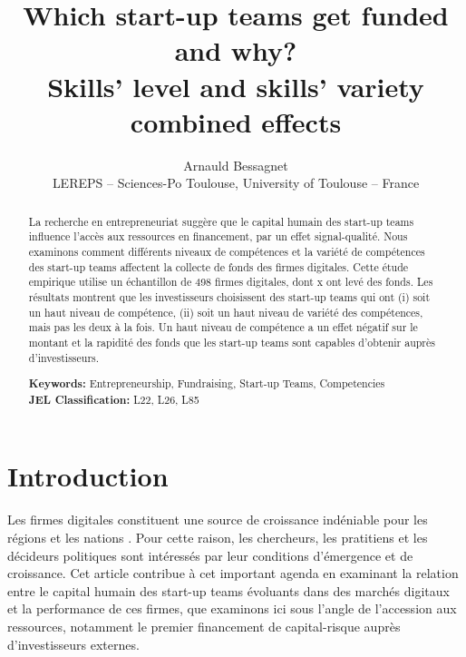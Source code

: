 \documentclass[12pt]{article}
\begin{document}
\title{Which start-up teams get funded and why? \\ Skills' level and skills' variety combined effects}
\date{\vspace{-3ex}}
\author{Arnauld Bessagnet \\ \footnotesize{LEREPS – Sciences-Po Toulouse, University of Toulouse – France} \\}

\maketitle \vspace{-1,5em}

\begin{abstract}
\noindent
La recherche en entrepreneuriat suggère que le capital humain des start-up teams influence l'accès aux ressources en financement, par un effet signal-qualité. Nous examinons comment différents niveaux de compétences et la variété de compétences des start-up teams affectent la collecte de fonds des firmes digitales. Cette étude empirique utilise un échantillon de 498 firmes digitales, dont x ont levé des fonds. Les résultats montrent que les investisseurs choisissent des start-up teams qui ont (i) soit un haut niveau de compétence, (ii) soit un haut niveau de variété des compétences, mais pas les deux à la fois. Un haut niveau de compétence a un effet négatif sur le montant et la rapidité des fonds que les start-up teams sont capables d'obtenir auprès d'investisseurs.
\newline

\begin{obeylines}
\noindent \footnotesize{}{\textbf{Keywords:} Entrepreneurship, Fundraising, Start-up Teams, Competencies}
\noindent \footnotesize{\textbf{JEL Classification:} L22, L26, L85}
\end{obeylines}

\end{abstract}

\clearpage
\section{Introduction}

Les firmes digitales constituent une source de croissance indéniable pour les régions et les nations \citep{acs2021evolution, autio2016entrepreneurship}. Pour cette raison, les chercheurs, les pratitiens et les décideurs politiques sont intéressés par leur conditions d'émergence et de croissance. Cet article contribue à cet important agenda en examinant la relation entre le capital humain des start-up teams évoluants dans des marchés digitaux et la performance de ces firmes, que examinons ici sous l'angle de l'accession aux ressources, notamment le premier financement de capital-risque auprès d'investisseurs externes.
\end{document}

